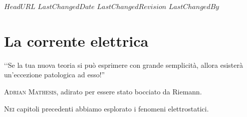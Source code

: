 \svnidlong
{$HeadURL$}
{$LastChangedDate$}
{$LastChangedRevision$}
{$LastChangedBy$}

\chapter{La corrente elettrica}

\begin{introduction}
	‘‘Se la tua nuova teoria si può esprimere con grande semplicità, allora esisterà un'eccezione patologica ad esso!'' %
\begin{flushright}
	\textsc{Adrian Mathesis,} adirato per essere stato bocciato da Riemann.
\end{flushright}
\end{introduction} %
\lettrine[findent=1pt, nindent=0pt]{N}{ei} capitoli precedenti abbiamo esplorato i fenomeni elettrostatici. 
